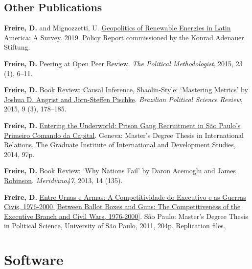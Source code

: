 \documentclass[a4paper]{article}
\renewenvironment{itemize}{
	\begin{list}{}{
			\setlength{\leftmargin}{1.5em}
		}
		}{
	\end{list}
}
\begin{document}
	\subsection*{Other Publications}

	\begin{itemize}
		\item \textbf{Freire, D.} and Mignozzetti, U.  \href{https://www.kas.de/documents/273477/273526/Geopolitics+of+Renewable+Energy+in+Latin+America+-+A+Survey.pdf/9fe39ef1-6028-0836-90b0-aada31cb6769?version=1.0&t=1551887777018}{Geopolitics of Renewable Energies in Latin America: A Survey}. 2019. Policy Report commissioned by the Konrad Adenauer Stiftung.
		\item \textbf{Freire, D.} \href{https://thepoliticalmethodologist.files.wordpress.com/2016/02/tpm_v23_n1.pdf}{Peering at Open Peer Review}. \textit{The Political Methodologist}, 2015, 23 (1), 6--11.
		\item \textbf{Freire, D.} \href{http://www.scielo.br/readcube/epdf.php?doi=10.1590/1981-38212015000300026&pid=S1981-38212015000300178&pdf_path=bpsr/v9n3/1981-3821-bpsr-9-3-0178.pdf&lang=en}{Book Review: Causal Inference, Shaolin-Style: `Mastering Metrics' by Joshua D. Angrist and J\"{o}rn-Steffen Pischke}. \textit{Brazilian Political Science Review}, 2015, 9 (3), 178--185.
		\item \textbf{Freire, D.} \href{http://dx.doi.org/10.6084/m9.figshare.1209203}{Entering the Underworld: Prison Gang Recruitment in S\~{a}o Paulo's Primeiro Comando da Capital}. Geneva: Master's Degree Thesis in International Relations, The Graduate Institute of International and Development Studies, 2014, 97p.
		\item \textbf{Freire, D.} \href{http://seer.bce.unb.br/index.php/MED/article/view/7505/6497}{Book Review: `Why Nations Fail' by Daron Acemoglu and James Robinson}. \textit{Meridiano47}, 2013, 14 (135).
		\item \textbf{Freire, D.} \href{http://dx.doi.org/10.6084/m9.figshare.963082}{Entre Urnas e Armas: A Competitividade do Executivo e as Guerras Civis, 1976-2000 {[}Between Ballot Boxes and Guns: The Competitiveness of the Executive Branch and Civil Wars, 1976-2000{]}}. S\~{a}o Paulo: Master's Degree Thesis in Political Science, University of S\~{a}o Paulo, 2011, 204p. \href{http://dx.doi.org/10.6084/m9.figshare.963183}{Replication files}.
	\end{itemize}

	\section*{Software}
\end{document}

